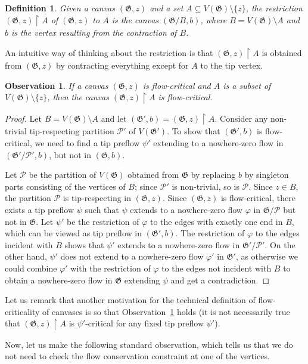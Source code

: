 \documentclass{article}
\newcommand{\PP}{\mathcal{P}}
\newcommand\g{\mathfrak{G}}
\newtheorem{observation}[theorem]{Observation}
\newtheorem{definition}[theorem]{Definition}
\begin{document}
\begin{definition}
Given a canvas $(\g,z)$ and a set $A\subseteq V(\g)\setminus \{z\}$, the \emph{restriction} $(\g,z)\restriction A$ of
$(\g,z)$ to $A$ is the canvas $(\g/B,b)$, where $B=V(\g)\setminus A$ and $b$ is the vertex resulting from the contraction of $B$.
\end{definition}
An intuitive way of thinking about the restriction is that $(\g,z)\restriction A$ is obtained from $(\g,z)$ by contracting everything except for $A$ to the tip vertex. 
\begin{observation}\label{obs-subcrit}
If a canvas $(\g,z)$ is flow-critical and $A$ is a subset of $V(\g)\setminus\{z\}$, then the canvas $(\g,z)\restriction A$ is flow-critical.
\end{observation}
\begin{proof}
Let $B=V(\g)\setminus A$ and let $(\g',b)=(\g,z)\restriction A$. Consider any non-trivial tip-respecting partition $\PP'$ of $V(\g')$.
To show that $(\g',b)$ is flow-critical, we need to find a tip preflow $\psi'$ extending to a nowhere-zero flow in $(\g'/\PP',b)$, but
not in $(\g,b)$.

Let $\PP$ be the partition of $V(\g)$ obtained from $\g$ by replacing $b$ by singleton parts consisting of the vertices of $B$;
since $\PP'$ is non-trivial, so is $\PP$.  Since $z\in B$, the partition $\PP$ is tip-respecting in $(\g,z)$.  
Since $(\g,z)$ is flow-critical, there exists a tip preflow $\psi$ such that $\psi$ extends to a nowhere-zero flow $\varphi$ in $\g/\PP$ but not in $\g$.
Let $\psi'$ be the restriction of $\varphi$ to the edges with exactly one end in $B$, which can be viewed as tip preflow in $(\g',b)$.
The restriction of $\varphi$ to the edges incident with $B$ shows that $\psi'$ extends to a nowhere-zero flow in $\g'/\PP'$.
On the other hand, $\psi'$ does not extend to a nowhere-zero flow $\varphi'$ in $\g'$, as otherwise we could combine $\varphi'$ with the
restriction of $\varphi$ to the edges not incident with $B$ to obtain a nowhere-zero flow in $\g$ extending $\psi$ and get a contradiction.
\end{proof}
Let us remark that another motivation for the technical definition of flow-criticality of canvases is so that Observation~\ref{obs-subcrit}
holds (it is not necessarily true that $(\g,z)\restriction A$ is $\psi'$-critical for any fixed tip preflow $\psi'$). 




Now, let us make the following standard observation, which tells us that we do not need to check the flow conservation constraint at one of the vertices.
\end{document}
